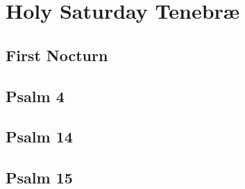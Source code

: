 \documentclass[12pt, a5paper]{book}
\begin{document}
	
\section*{Holy Saturday Tenebr\ae}
\subsection{First Nocturn }




\subsection{Psalm 4}





\subsection{Psalm 14}



\pagebreak



\subsection{Psalm 15}
















\begin {center}\end{center}
\end{document}
